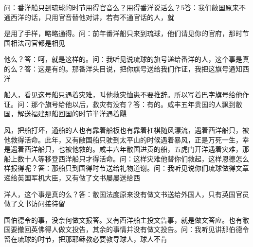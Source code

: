\begin{BookQuote}
问：番洋船只到琉球的时节用得官音么？用得番洋说话么？5答：我们敝国原来不通西洋的话，只用官音替他对讲，若有不通官话的人，就
\end{BookQuote}

\vfill
\begin{BookNotes}
\end{BookNotes}

是用了手样，略略通得。问：前年番洋船只来到琉球，他们请见你的官府，那时节国相法司官都是相见

他么？答：呵，就是这样的。问：我听见说琉球的旗号递给番洋的人，这个事是真的么？答：这是有的。那番洋头目说，把你旗号送给我们作证，我把这旗号通知西洋

船人，看见这号船只遇着灾难，叫他救灾恤患不要推辞。所以写着巴字旗号给他作证。问：那个旗号给他以后，救灾有没有？答：有的。咸丰五年贵国的人飘到敝国，解送福建那船回国的时节半洋遇着飓

风，把船打坏，通船的人也有靠着船板也有靠着杠棋随风漂流，遇着西洋船只，被他救得活命。此年，又有敝国船只驶到太平山的时候遇着暴风，正是万死一生，幸是遇着西洋船只，也被他救的。咸丰六年敝国进贡的船，五虎门开洋遇着灾难，那船上数十人等移登西洋船只才得活命。问：这样灾难他替你们救起，这样恩德怎么样报得呢？答：那船只到国得时节送给礼物道谢。问：我听见说你们琉球做得文章递给英国军机大臣，又有做了文书屡屡送给西

洋人，这个事是真的么？答：敝国法度原来没有做文书送给外国人，只有英国官员做了文书访问接待留

国伯德令的事，没奈何做文报答。又有西洋船主投文告事，就是做文答应。也有敝国要撤回英佛得人做文投告，其余的事情并没有做文投告。问：我听见讲那伯德令留在琉球的时节，把那耶稣教必要教导球人，球人不肯

